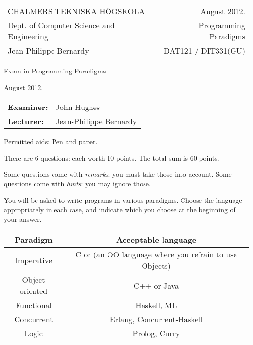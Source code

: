 \documentclass{article}
\begin{document}
\setlength{\parskip}{2pt} 

\newcommand{\examtime}{August 2012}
\newcommand{\points}[1]{\marginpar{\bf #1 points}}
\noindent
\begin{tabular}{lr}
CHALMERS TEKNISKA H\"OGSKOLA &\examtime{}.\\
Dept. of Computer Science and Engineering & Programming Paradigms\\
Jean-Philippe Bernardy                 & DAT121 / DIT331(GU) \\
\end{tabular}

\vspace{2.5cm} \noindent
\begin{center} {\LARGE
Exam in Programming Paradigms}
\end{center}

\vspace{1.5cm}

\noindent
\examtime{}.\\
\begin{tabular}{ll}
\textbf{Examiner:} &  John Hughes  \\
\textbf{Lecturer:} & Jean-Philippe Bernardy
\end{tabular}
\vspace{1cm}

\noindent
Permitted aids: Pen and paper. 

There are 6 questions: each worth 10 points. The total sum is 60
points.  

Some questions come with \emph{remarks}: you must take those
into account.  Some questions come with \emph{hints}: you may ignore
those.

You will be asked to write programs in various paradigms. Choose the
language appropriately in each case, and indicate which you choose at
the beginning of your answer.

\begin{tabular}[p]{cc}
  Paradigm & Acceptable language \\ \hline
  Imperative   & C or (an OO language where you refrain to use Objects) \\
  Object oriented & C++ or Java \\
  Functional & Haskell, ML \\
  Concurrent & Erlang, Concurrent-Haskell \\
  Logic & Prolog, Curry 
\end{tabular}
\end{document}
